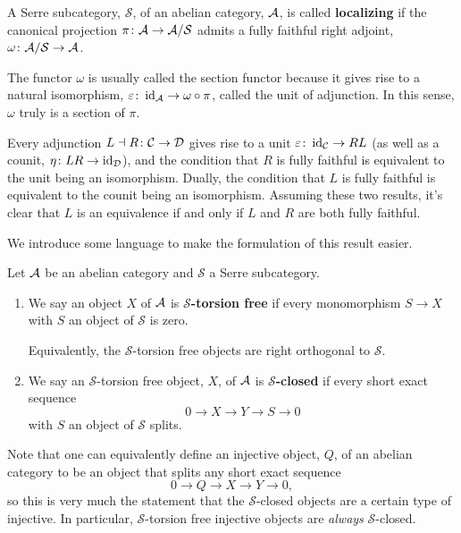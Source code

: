 \documentclass[reqno, 12pt]{amsart}
\begin{document}
\begin{definition}
  A Serre subcategory, $\mathcal{S}$, of an abelian category, $\mathcal{A}$, is called \textbf{localizing} if the canonical projection $\pi \colon \mathcal{A} \to \mathcal{A}/\mathcal{S}$ admits a fully faithful right adjoint, $\omega \colon \mathcal{A}/\mathcal{S} \to \mathcal{A}$.

  The functor $\omega$ is usually called the section functor because it gives rise to a natural isomorphism, $\varepsilon \colon \operatorname{id}_{\mathcal{A}} \to \omega \circ \pi$, called the unit of adjunction.
  In this sense, $\omega$ truly is a section of $\pi$.
\end{definition}

\begin{remark}
  Every adjunction $L \dashv R \colon \mathcal{C} \to \mathcal{D}$ gives rise to a unit $\varepsilon \colon \operatorname{id}_{\mathcal{C}} \to RL$ (as well as a counit, $\eta \colon LR \to \operatorname{id}_{\mathcal{D}}$), and the condition that $R$ is fully faithful is equivalent to the unit being an isomorphism.
  Dually, the condition that $L$ is fully faithful is equivalent to the counit being an isomorphism.
  Assuming these two results, it's clear that $L$ is an equivalence if and only if $L$ and $R$ are both fully faithful.
\end{remark}

We introduce some language to make the formulation of this result easier.

\begin{definition}
  Let $\mathcal{A}$ be an abelian category and $\mathcal{S}$ a Serre subcategory.
  \begin{enumerate}
  \item
    We say an object $X$ of $\mathcal{A}$ is {\bf $\mathcal{S}$-torsion free} if every monomorphism $S \to X$ with $S$ an object of $\mathcal{S}$ is zero.

    Equivalently, the $\mathcal{S}$-torsion free objects are right orthogonal to $\mathcal{S}$.
  \item
    We say an $\mathcal{S}$-torsion free object, $X$, of $\mathcal{A}$ is {\bf $\mathcal{S}$-closed} if every short exact sequence
    $$0 \to X \to Y \to S \to 0$$
    with $S$ an object of $\mathcal{S}$ splits.
  \end{enumerate}
\end{definition}

\begin{remark}
  Note that one can equivalently define an injective object, $Q$, of an abelian category to be an object that splits any short exact sequence
  $$0 \to Q \to X \to Y \to 0,$$
  so this is very much the statement that the $\mathcal{S}$-closed objects are a certain type of injective.
  In particular, $\mathcal{S}$-torsion free injective objects are \emph{always} $\mathcal{S}$-closed.
\end{remark}
\end{document}
